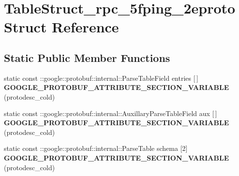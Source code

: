 \hypertarget{structTableStruct__rpc__5fping__2eproto}{}\section{Table\+Struct\+\_\+rpc\+\_\+5fping\+\_\+2eproto Struct Reference}
\label{structTableStruct__rpc__5fping__2eproto}
\subsection*{Static Public Member Functions}
\begin{DoxyCompactItemize}
\item 
\mbox{\label{structTableStruct__rpc__5fping__2eproto_a6966b70126b8f5bb7e61b515d776ba40}} 
static const \+::google\+::protobuf\+::internal\+::\+Parse\+Table\+Field entries \mbox{[}$\,$\mbox{]} {\bfseries G\+O\+O\+G\+L\+E\+\_\+\+P\+R\+O\+T\+O\+B\+U\+F\+\_\+\+A\+T\+T\+R\+I\+B\+U\+T\+E\+\_\+\+S\+E\+C\+T\+I\+O\+N\+\_\+\+V\+A\+R\+I\+A\+B\+LE} (protodesc\+\_\+cold)
\item 
\mbox{\label{structTableStruct__rpc__5fping__2eproto_aa4e502721dd0688e29ca5404007ef0ce}} 
static const \+::google\+::protobuf\+::internal\+::\+Auxillary\+Parse\+Table\+Field aux \mbox{[}$\,$\mbox{]} {\bfseries G\+O\+O\+G\+L\+E\+\_\+\+P\+R\+O\+T\+O\+B\+U\+F\+\_\+\+A\+T\+T\+R\+I\+B\+U\+T\+E\+\_\+\+S\+E\+C\+T\+I\+O\+N\+\_\+\+V\+A\+R\+I\+A\+B\+LE} (protodesc\+\_\+cold)
\item 
\mbox{\label{structTableStruct__rpc__5fping__2eproto_aa61bda58d0010a6920a73d93cf88937e}} 
static const \+::google\+::protobuf\+::internal\+::\+Parse\+Table schema \mbox{[}2\mbox{]} {\bfseries G\+O\+O\+G\+L\+E\+\_\+\+P\+R\+O\+T\+O\+B\+U\+F\+\_\+\+A\+T\+T\+R\+I\+B\+U\+T\+E\+\_\+\+S\+E\+C\+T\+I\+O\+N\+\_\+\+V\+A\+R\+I\+A\+B\+LE} (protodesc\+\_\+cold)
\end{DoxyCompactItemize}
